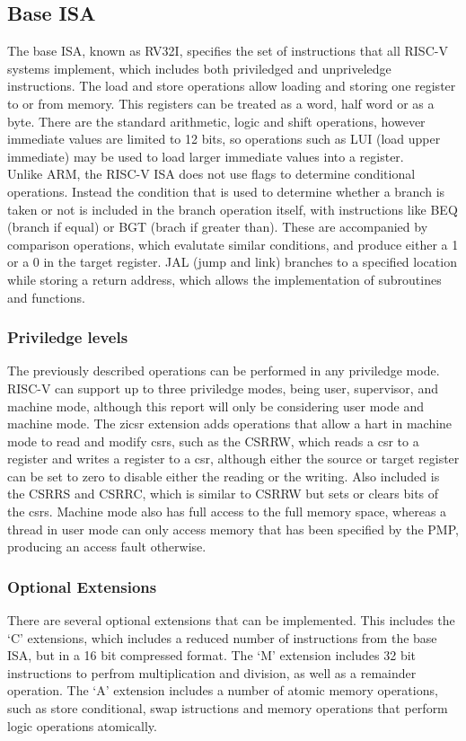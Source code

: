 \subsection{Base ISA}
The base ISA, known as RV32I, specifies the set of instructions that all RISC-V systems implement, which includes both priviledged and unpriveledge instructions. The load and store operations allow loading and storing one register to or from memory. This registers can be treated as a word, half word or as a byte. There are the standard arithmetic, logic and shift operations, however immediate values are limited to 12 bits, so operations such as LUI (load upper immediate) may be used to load larger immediate values into a register.\\
Unlike ARM, the RISC-V ISA does not use flags to determine conditional operations. Instead the condition that is used to determine whether a branch is taken or not is included in the branch operation itself, with instructions like BEQ (branch if equal) or BGT (brach if greater than). These are accompanied by comparison operations, which evalutate similar conditions, and produce either a 1 or a 0 in the target register. JAL (jump and link) branches to a specified location while storing a return address, which allows the implementation of subroutines and functions. 
\subsubsection{Priviledge levels}
The previously described operations can be performed in any priviledge mode. RISC-V can support up to three priviledge modes, being user, supervisor, and machine mode, although this report will only be considering user mode and machine mode. The zicsr extension adds operations that allow a hart in machine mode to read and modify \ac{csrs}, such as the CSRRW, which reads a csr to a register and writes a register to a csr, although either the source or target register can be set to zero to disable either the reading or the writing. Also included is the CSRRS and CSRRC, which is similar to CSRRW but sets or clears bits of the \ac{csrs}. Machine mode also has full access to the full memory space, whereas a thread in user mode can only access memory that has been specified by the PMP, producing an access fault otherwise.
\subsubsection{Optional Extensions}
There are several optional extensions that can be implemented. This includes the `C' extensions, which includes a reduced number of instructions from the base ISA, but in a 16 bit compressed format. The `M' extension includes 32 bit instructions to perfrom multiplication and division, as well as a remainder operation. The `A' extension includes a number of atomic memory operations, such as store conditional, swap istructions and memory operations that perform logic operations atomically.
